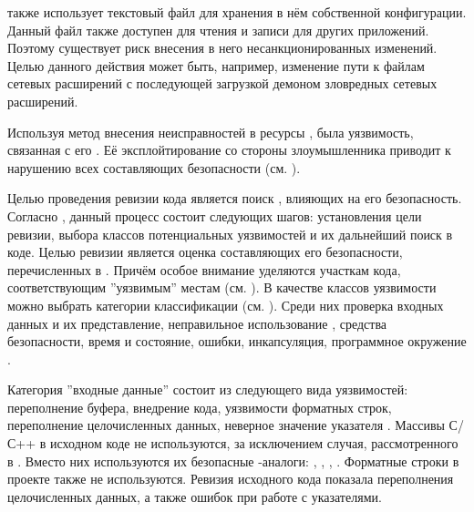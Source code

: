 %
 также использует текстовый файл для хранения в нём собственной конфигурации. 
%
Данный файл также доступен для чтения и записи для других приложений. 
%
Поэтому существует риск внесения в него несанкционированных изменений. 
%
Целью данного действия может быть, например, изменение пути к файлам сетевых расширений с последующей загрузкой демоном зловредных сетевых расширений.

%
Используя метод внесения неисправностей в ресурсы , была  уязвимость, связанная с его . 
%
Её эксплойтирование со стороны злоумышленника приводит к нарушению всех составляющих безопасности  (см. ).


%
Целью проведения ревизии кода  является поиск , влияющих на его безопасность.  
%
Согласно  , данный процесс состоит следующих шагов: установления цели ревизии, выбора классов потенциальных уязвимостей и их дальнейший поиск в коде. 
%
Целью ревизии  является оценка составляющих его безопасности, перечисленных в . 
%
Причём особое внимание уделяются участкам кода, соответствующим ''уязвимым'' местам (см. ). 
%
В качестве классов уязвимости можно выбрать категории классификации  (см. ). 
%
Среди них проверка входных данных и их представление, неправильное использование , средства безопасности, время и состояние, ошибки, инкапсуляция, программное окружение . 

%
Категория ''входные данные'' состоит из следующего вида уязвимостей: переполнение буфера, внедрение кода, уязвимости форматных строк, переполнение целочисленных данных, неверное значение указателя . 
%
Массивы С/С++ в исходном коде  не используются, за исключением случая, рассмотренного в . 
%
Вместо них используются их безопасные -аналоги: , , ,  . 
%
Форматные строки в проекте также не используются. 
%
Ревизия исходного кода показала  переполнения целочисленных данных, а также ошибок при работе с указателями. 

